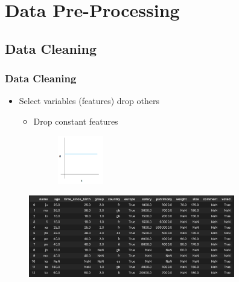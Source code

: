 



\begin{frame}
   \titlepage
\end{frame}



\begin{frame}
   \tableofcontents
\end{frame}



\section{Data Pre-Processing}


\subsection{Data Cleaning}


\begin{frame}\frametitle{Data Cleaning}
   \begin{itemize}
      \item Select variables (features) drop others
      \begin{itemize}
         \item Drop constant features
         \begin{minipage}{0.38\linewidth}
            \begin{figure}[H]
               \includegraphics[width=2cm]{../images/illustrations/data_cleaning_constant.png}
            \end{figure}
         \end{minipage}         
      \end{itemize}
   \end{itemize}
   \begin{figure}[H]
      \includegraphics[width=9cm]{../images/illustrations/data_cleaning_df_origin.png}
   \end{figure}
\end{frame}


